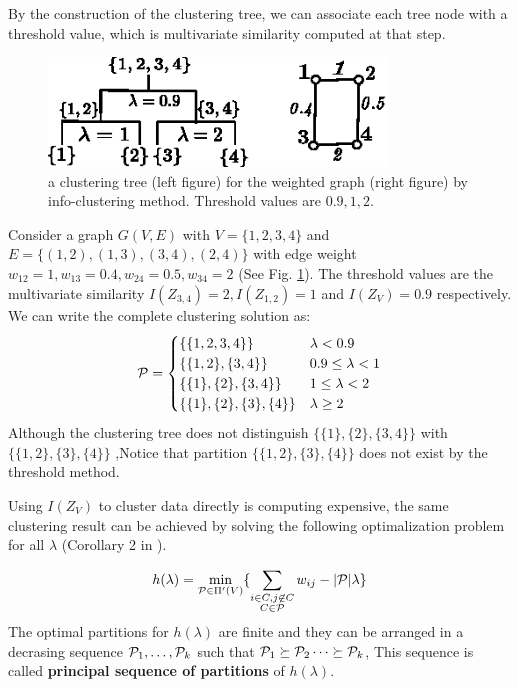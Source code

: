 \documentclass{article}
\begin{document}
By the construction of the clustering tree, we can associate each tree node with a threshold value, which is multivariate similarity computed at that step.
\begin{example}
\begin{figure}
\centering
\includegraphics[width=0.8\textwidth]{threshold.eps}
\caption{a clustering tree (left figure) for the weighted graph (right figure) by info-clustering method. Threshold values are $0.9, 1, 2$.}\label{fig:threshold}
\end{figure}
Consider a graph $G(V, E)$ with $V=\{1,2,3,4\}$ and $E=\{(1,2),(1,3),(3,4),(2,4)\}$ with edge weight $w_{12}=1,w_{13}=0.4,w_{24}=0.5,w_{34}=2$ (See Fig. \ref{fig:threshold}). The threshold values are the multivariate similarity $I(Z_{3,4})=2, I(Z_{1,2})=1$ and $I(Z_V)=0.9$ respectively. We can write the complete clustering solution as:
\begin{equation*}
\P = 
\begin{cases}
\{\{1,2,3,4\}\} & \lambda < 0.9 \\
\{\{1,2\},\{3,4\}\} & 0.9 \leq \lambda < 1 \\
\{\{1\},\{2\},\{3,4\}\} & 1 \leq \lambda < 2\\
\{\{1\},\{2\},\{3\},\{4\}\} & \lambda \geq 2
\end{cases}
\end{equation*}
Although the clustering tree does not distinguish $\{\{1\},\{2\},\{3,4\}\}$ with $\{\{1,2\},\{3\}, \{4\}\}$ ,Notice that partition $\{\{1,2\},\{3\}, \{4\}\}$ does not exist by the threshold method.
\end{example}
Using $I(Z_V)$ to cluster data directly is computing expensive, the same clustering result can be achieved by solving the following optimalization problem for all $\lambda$ (Corollary 2 in \cite{RN1}).
\begin{proposition}
\begin{equation}\label{eq:hL}
h(\lambda) = \min_{\P \in \Pi'(V)}\{ \sum_{\substack{i\in C, j \not\in C\\ C\in \mathcal{P}}}w_{ij} - \abs{\P} \lambda \}
\end{equation}
The optimal partitions for $h(\lambda)$ are finite and they can be arranged in a decrasing sequence $\P_1, \dots, \P_k$ such that $\P_1 \succeq \P_2 \dots \succeq \P_k$, This sequence is called \textbf{principal sequence of partitions} of $h(\lambda)$\cite{RN17}.
\end{proposition}
\end{document}
